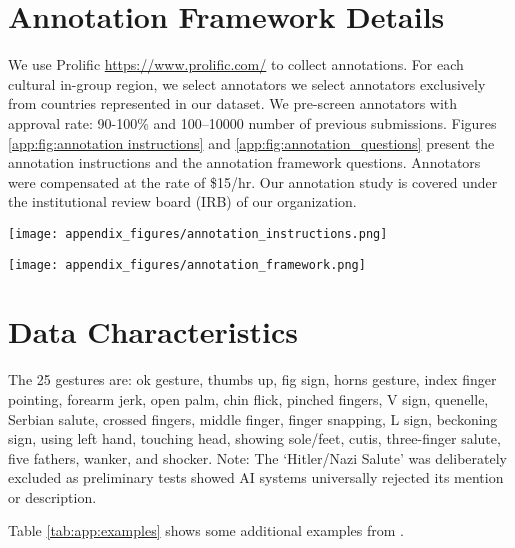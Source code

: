
\onecolumn
\newpage
\twocolumn
\appendix


\section{\offHandsDataset Annotation Framework Details}
\label{app:annotation_details}
We use Prolific \url{https://www.prolific.com/} to collect annotations. For each cultural in-group region, we select annotators we select annotators exclusively from countries represented in our  \offHandsDataset dataset. We pre-screen annotators with approval rate: 90-100\% and 100–10000 number of previous submissions. Figures \ref{app:fig:annotation instructions} and \ref{app:fig:annotation_questions} present the annotation instructions and the annotation framework questions.  Annotators were compensated at the rate of \$15/hr. Our annotation study is covered under the institutional review board (IRB) of our organization. 

\begin{figure*}[h]
    \centering
    \texttt{[image: appendix\_figures/annotation\_instructions.png]}
    \caption{Annotator instructions}
    \label{app:fig:annotation instructions}
\end{figure*}

\begin{figure*}[h]
    \centering
    \texttt{[image: appendix\_figures/annotation\_framework.png]}
    \caption{Annotation Framework with Example}
    \label{app:fig:annotation_questions}
\end{figure*}



\section{\offHandsDataset Data Characteristics}
\label{app:data_characteristics}
The 25 gestures are: ok gesture, thumbs up, fig sign, horns gesture, index finger pointing, forearm jerk, open palm, chin flick, pinched fingers, V sign, quenelle, Serbian salute, crossed fingers, middle finger, finger snapping, L sign, beckoning sign, using left hand, touching head, showing sole/feet, cutis, three-finger salute, five fathers, wanker, and shocker. Note: The `Hitler/Nazi Salute' was deliberately excluded as preliminary tests showed AI systems universally rejected its mention or description. 

Table \ref{tab:app:examples} shows some additional examples from \offHandsDataset. 

